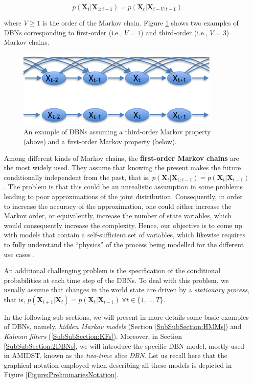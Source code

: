 $$p(\bm X_t| \bm X_{1:t-1})  = p(\bm X_t|\bm X_{t-V:t-1})$$

\noindent where $V\geq 1$ is the order of the Markov chain. Figure \ref{Figure:markovChain} shows two examples of DBNs corresponding to first-order (i.e., $V=1$) and third-order (i.e., $V=3$) Markov chains. 

\begin{figure}[ht!]
\begin{center}
\includegraphics[scale=0.56]{./figures/PreliminariesMarkovChain}
\caption{\label{Figure:markovChain} An example of DBNs assuming a third-order Markov property (above) and a first-order Markov property (below).
}
\end{center}
\end{figure}

Among different kinds of Markov chains, the \textbf{first-order Markov chains} are the most widely used. They assume that knowing the present makes the future conditionally independent from the past, that is, $p(\bm X_t| \bm X_{1:t-1})  = p(\bm X_t|\bm X_{t-1})$. The problem is that this could be an unrealistic assumption in some problems leading to poor approximations of the joint distribution. Consequently, in order to increase the accuracy of the approximation, one could either increase the Markov order, or equivalently, increase the number of state variables, which would consequently increase the complexity. Hence, our objective is to come up with models that contain a self-sufficient set of variables, which likewise requires to fully understand the ``physics''  of the process being modelled for the different use cases \cite{russelNorvig2009}. 

An additional challenging problem is the specification of the conditional probabilities at each time step of the DBNs. To deal with this problem, we usually assume that changes in the world state are driven by a \textit{stationary process}, that is, $p(\bm X_{t+1}|\bm X_{t}) = p(\bm X_t|\bm X_{t-1})\ \forall t \in\{1,\ldots,T\}$. 

In the following sub-sections, we will present in more details some basic examples of DBNs, namely, \textit{hidden Markov models} (Section \ref{SubSubSection:HMMs}) and \textit{Kalman filters} (\ref{SubSubSection:KFs}). Moreover, in Section \ref{SubSubSection:2DBNs}, we will introduce the specific DBN model, mostly used in AMIDST, known as the \textit{two-time slice DBN}. Let us recall here that the graphical notation employed when describing all these models is depicted in Figure \ref{Figure:PreliminariesNotation}.

